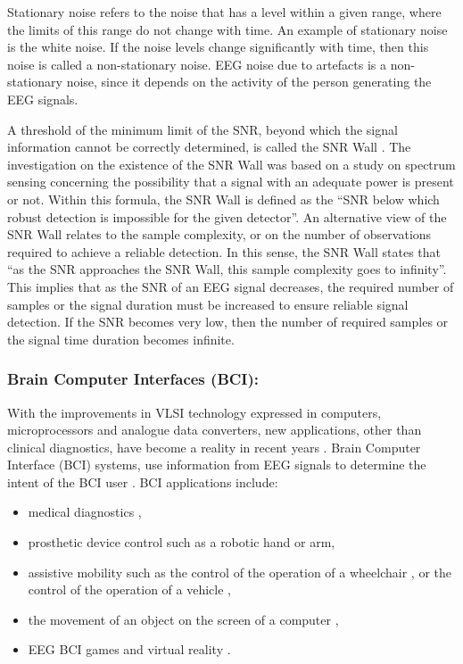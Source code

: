 Stationary noise refers to the noise that has a level within a given range, where the limits of this range do not change with time. An example of stationary noise is the white noise. If the noise levels change significantly with time, then this noise is called a non-stationary noise. EEG noise due to artefacts is a non-stationary noise, since it depends on the activity of the person generating the EEG signals. 

A threshold of the minimum limit of the SNR, beyond which the signal information cannot be correctly determined, is called the SNR Wall \citep{Tandra2008a, Kustra2017, Tandra2008b}.  The investigation on the existence of the SNR Wall was based on a study on spectrum sensing concerning the possibility that a signal with an adequate power is present or not. Within this formula, the SNR Wall is defined as the “SNR below which robust detection is impossible for the given detector”. An alternative view of the SNR Wall relates to the sample complexity, or on the number of observations required to achieve a reliable detection.  In this sense, the SNR Wall states that “as the SNR approaches the SNR Wall, this sample complexity goes to infinity”. This implies that as the SNR of an EEG signal decreases, the required number of samples or the signal duration must be increased to ensure reliable signal detection. If the SNR becomes very low, then the number of required samples or the signal time duration becomes infinite. 

\subsubsection{\bf{Brain Computer Interfaces (BCI):}}
With the improvements in VLSI technology expressed in computers, microprocessors and analogue data converters, new applications, other than clinical diagnostics, have become a reality in recent years \citep{Liao2014, Ahmadi2012}. Brain Computer Interface (BCI) systems, use information from EEG signals to determine the intent of the BCI user \citep{Rak2012, Liu2018}. BCI applications include:

\begin{itemize}
	\item medical diagnostics \citep{Chung2015}, 
	\item prosthetic device control such as a robotic hand or arm, 
	\item assistive mobility such as the control of the operation of a wheelchair \citep{Gala2008}, or the control of the operation of a vehicle \citep{Babu2017},
	\item the movement of an object on the screen of a computer \citep{Wolpaw2004}, 
	\item EEG BCI games and virtual reality \citep{Martisius2016, Kerous2018, Ahn2014}. 
\end{itemize}

